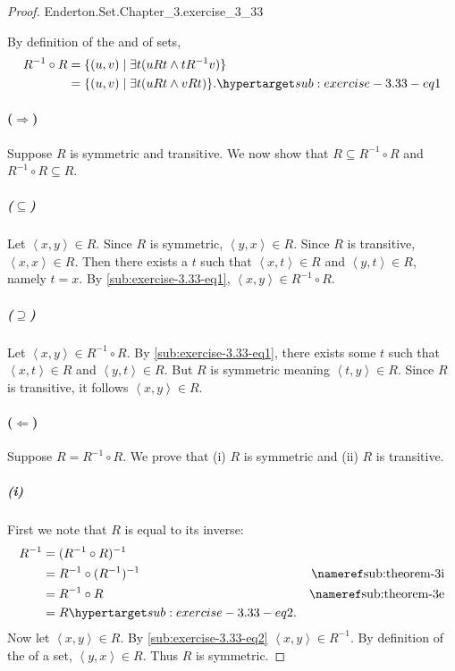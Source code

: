 \documentclass{report}
\newcommand{\pair}[1]{\left< #1 \right>}
\begin{document}
\begin{proof}

    {Enderton.Set.Chapter\_3.exercise\_3\_33}

  By definition of the  and 
    of sets,
    \begin{align}
      R^{-1} \circ R
        & = \{ (u, v) \mid \exists t(uRt \land tR^{-1}v) \}
          \nonumber \\
        & = \{ (u, v) \mid \exists t(uRt \land vRt) \}.
          \hyperlabel{sub:exercise-3.33-eq1}
    \end{align}

  \paragraph{($\Rightarrow$)}%

    Suppose $R$ is symmetric and transitive.
    We now show that $R \subseteq R^{-1} \circ R$ and
      $R^{-1} \circ R \subseteq R$.

    \subparagraph{($\subseteq$)}%

      Let $\pair{x, y} \in R$.
      Since $R$ is symmetric, $\pair{y, x} \in R$.
      Since $R$ is transitive, $\pair{x, x} \in R$.
      Then there exists a $t$ such that $\pair{x, t} \in R$ and
        $\pair{y, t} \in R$, namely $t = x$.
      By \eqref{sub:exercise-3.33-eq1},
        $\pair{x, y} \in R^{-1} \circ R$.

    \subparagraph{($\supseteq$)}%

      Let $\pair{x, y} \in R^{-1} \circ R$.
      By \eqref{sub:exercise-3.33-eq1}, there exists some $t$ such that
        $\pair{x, t} \in R$ and $\pair{y, t} \in R$.
      But $R$ is symmetric meaning $\pair{t, y} \in R$.
      Since $R$ is transitive, it follows $\pair{x, y} \in R$.

  \paragraph{($\Leftarrow$)}%

    Suppose $R = R^{-1} \circ R$.
    We prove that (i) $R$ is symmetric and (ii) $R$ is transitive.

    \subparagraph{(i)}%

      First we note that $R$ is equal to its inverse:
        \begin{align}
          R^{-1}
            & = (R^{-1} \circ R)^{-1} \nonumber \\
            & = R^{-1} \circ (R^{-1})^{-1}
              & \textref{sub:theorem-3i} \nonumber \\
            & = R^{-1} \circ R
              & \textref{sub:theorem-3e} \nonumber \\
            & = R \hyperlabel{sub:exercise-3.33-eq2}.
        \end{align}
      Now let $\pair{x, y} \in R$.
      By \eqref{sub:exercise-3.33-eq2} $\pair{x, y} \in R^{-1}$.
      By definition of the  of a set,
        $\pair{y, x} \in R$.
      Thus $R$ is symmetric.


\end{proof}
\end{document}
